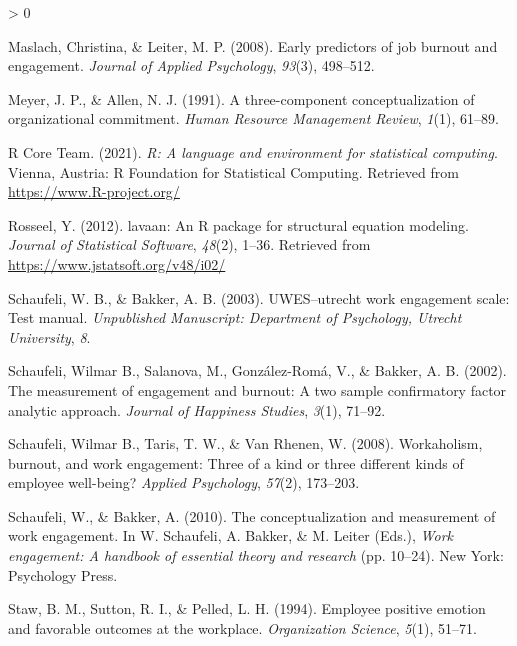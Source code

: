 \documentclass[
  english,
  man]{apa6}
\newlength{\cslhangindent}
\newenvironment{CSLReferences}[2] %
 {%
  \setlength{\parindent}{0pt}
  \ifodd #1 \everypar{\setlength{\hangindent}{\cslhangindent}}\ignorespaces\fi
  \ifnum #2 > 0
  \setlength{\parskip}{#2\baselineskip}
  \fi
 }%
 {}
\begin{document}
\begin{CSLReferences}{1}{0}
\leavevmode\hypertarget{ref-maslach_early_2008}{}%
Maslach, Christina, \& Leiter, M. P. (2008). Early predictors of job burnout and engagement. \emph{Journal of Applied Psychology}, \emph{93}(3), 498--512.

\leavevmode\hypertarget{ref-meyer_three-component_1991}{}%
Meyer, J. P., \& Allen, N. J. (1991). A three-component conceptualization of organizational commitment. \emph{Human Resource Management Review}, \emph{1}(1), 61--89.

\leavevmode\hypertarget{ref-R-base}{}%
R Core Team. (2021). \emph{R: A language and environment for statistical computing}. Vienna, Austria: R Foundation for Statistical Computing. Retrieved from \url{https://www.R-project.org/}

\leavevmode\hypertarget{ref-R-lavaan}{}%
Rosseel, Y. (2012). {lavaan}: An {R} package for structural equation modeling. \emph{Journal of Statistical Software}, \emph{48}(2), 1--36. Retrieved from \url{https://www.jstatsoft.org/v48/i02/}

\leavevmode\hypertarget{ref-schaufeli_uwesutrecht_2003}{}%
Schaufeli, W. B., \& Bakker, A. B. (2003). {UWES}--utrecht work engagement scale: Test manual. \emph{Unpublished Manuscript: Department of Psychology, Utrecht University}, \emph{8}.

\leavevmode\hypertarget{ref-schaufeli_measurement_2002}{}%
Schaufeli, Wilmar B., Salanova, M., González-Romá, V., \& Bakker, A. B. (2002). The measurement of engagement and burnout: A two sample confirmatory factor analytic approach. \emph{Journal of Happiness Studies}, \emph{3}(1), 71--92.

\leavevmode\hypertarget{ref-schaufeli2008workaholism}{}%
Schaufeli, Wilmar B., Taris, T. W., \& Van Rhenen, W. (2008). Workaholism, burnout, and work engagement: Three of a kind or three different kinds of employee well-being? \emph{Applied Psychology}, \emph{57}(2), 173--203.

\leavevmode\hypertarget{ref-schaufeli_conceptualization_2010}{}%
Schaufeli, W., \& Bakker, A. (2010). The conceptualization and measurement of work engagement. In W. Schaufeli, A. Bakker, \& M. Leiter (Eds.), \emph{Work engagement: A handbook of essential theory and research} (pp. 10--24). New York: Psychology Press.

\leavevmode\hypertarget{ref-staw_employee_1994}{}%
Staw, B. M., Sutton, R. I., \& Pelled, L. H. (1994). Employee positive emotion and favorable outcomes at the workplace. \emph{Organization Science}, \emph{5}(1), 51--71.


\end{CSLReferences}
\end{document}

